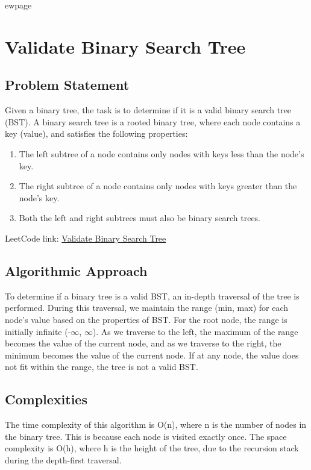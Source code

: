 
ewpage
\chapter{Validate Binary Search Tree}
\label{chap:validate_binary_search_tree}

\section*{Problem Statement}

Given a binary tree, the task is to determine if it is a valid binary search tree (BST). A binary search tree is a rooted binary tree, where each node contains a key (value), and satisfies the following properties:

\begin{enumerate}
    \item The left subtree of a node contains only nodes with keys less than the node's key.
    \item The right subtree of a node contains only nodes with keys greater than the node's key.
    \item Both the left and right subtrees must also be binary search trees.
\end{enumerate}

LeetCode link: \href{https://leetcode.com/problems/validate-binary-search-tree/}{Validate Binary Search Tree}

\section*{Algorithmic Approach}

To determine if a binary tree is a valid BST, an in-depth traversal of the tree is performed. During this traversal, we maintain the range (min, max) for each node's value based on the properties of BST. For the root node, the range is initially infinite (-$\infty$, $\infty$). As we traverse to the left, the maximum of the range becomes the value of the current node, and as we traverse to the right, the minimum becomes the value of the current node. If at any node, the value does not fit within the range, the tree is not a valid BST.

\section*{Complexities}

The time complexity of this algorithm is O(n), where n is the number of nodes in the binary tree. This is because each node is visited exactly once. The space complexity is O(h), where h is the height of the tree, due to the recursion stack during the depth-first traversal.


